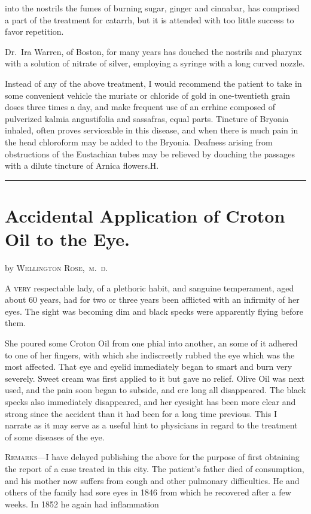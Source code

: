 into the nostrils the fumes of burning sugar, ginger and cinnabar,
has comprised a part of the treatment for catarrh, but it is attended
with too little success to favor repetition.

Dr.~Ira Warren, of Boston, for many years has douched the nostrils
and pharynx with a solution of nitrate of silver, employing a syringe
with a long curved nozzle.

Instead of any of the above treatment, I would recommend the patient
to take in some convenient vehicle the muriate or chloride of gold
in one-twentieth grain doses three times a day, and make frequent use
of an errhine composed of pulverized kalmia angustifolia and sassafras,
equal parts. Tincture of Bryonia inhaled, often proves serviceable in
this disease, and when there is much pain in the head chloroform may
be added to the Bryonia. Deafness arising from obstructions of the
Eustachian tubes may be relieved by douching the passages with a dilute
tincture of Arnica flowers.\hfill{}H.\quad{}

\fancybreak{* * *}

\section*{Accidental Application of Croton Oil to the Eye.}

by \textsc{Wellington Rose,\ m.~d.}

\lettrine[lines=1]{}{A very} respectable lady, of a plethoric habit, and sanguine temperament,
aged about 60 years, had for two or three years been afflicted
with an infirmity of her eyes. The sight was becoming dim and black
specks were apparently flying before them.

She poured some Croton Oil from one phial into another, an some
of it adhered to one of her fingers, with which she indiscreetly rubbed
the eye which was the most affected. That eye and eyelid immediately
began to smart and burn very severely. Sweet cream was first applied
to it but gave no relief. Olive Oil was next used, and the pain soon began
to subside, and ere long all disappeared. The black specks also immediately
disappeared, and her eyesight has been more clear and strong
since the accident than it had been for a long time previous. This I narrate
as it may serve as a useful hint to physicians in regard to the treatment
of some diseases of the eye.

\textsc{Remarks}---I have delayed publishing the above for the purpose of first
obtaining the report of a case treated in this city. The patient's father
died of consumption, and his mother now suffers from cough and other
pulmonary difficulties. He and others of the family had sore eyes in 1846
from which he recovered after a few weeks. In 1852 he again had inflammation\endinput
